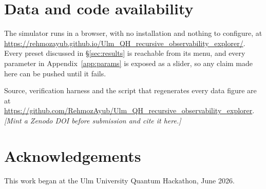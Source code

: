 \documentclass[11pt]{article}
\theoremstyle{plain}
\theoremstyle{definition}
\begin{document}
\vspace{1em}












\section*{Data and code availability}
The simulator runs in a browser, with no installation and nothing to configure,
at \url{https://rehmozayub.github.io/Ulm_QH_recursive_observability_explorer/}.
Every preset discussed in \S\ref{sec:results} is reachable from its menu, and
every parameter in Appendix~\ref{app:params} is exposed as a slider, so any
claim made here can be pushed until it fails.

Source, verification harness and the script that regenerates every data figure
are at
\url{https://github.com/RehmozAyub/Ulm_QH_recursive_observability_explorer}.
\textit{[Mint a Zenodo DOI before submission and cite it here.]}

\section*{Acknowledgements}
This work began at the Ulm University Quantum Hackathon, June 2026.

\clearpage
\appendix







\end{document}
